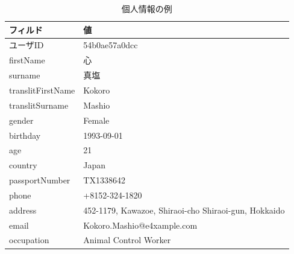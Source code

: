 \begin{itemize}
	\begin{table}[h]
	\begin{center}
	\begin{tabular}{| l | p{72mm} |}
		\hline
		\rowstyle{\bfseries}
		フィルド & 値 \\
		\hline
		ユーザID & 54b0ae57a0dcc \\
		\hline
		firstName & 心 \\
		\hline
		surname & 真塩 \\
		\hline
		translitFirstName & Kokoro \\
		\hline
		translitSurname & Mashio \\
		\hline
		gender & Female \\
		\hline
		birthday & 1993-09-01 \\
		\hline
		age & 21 \\
		\hline
		country & Japan \\
		\hline
		passportNumber & TX1338642 \\
		\hline
		phone & +8152-324-1820 \\
		\hline
		address & 452-1179, Kawazoe, Shiraoi-cho Shiraoi-gun, Hokkaido \\
		\hline
		email & Kokoro.Mashio@e4xample.com \\
		\hline
		occupation & Animal Control Worker \\
		\hline
	\end{tabular}
	\caption{個人情報の例}
	\label{table:data_person}
	\end{center}
	\end{table}
\end{itemize}
